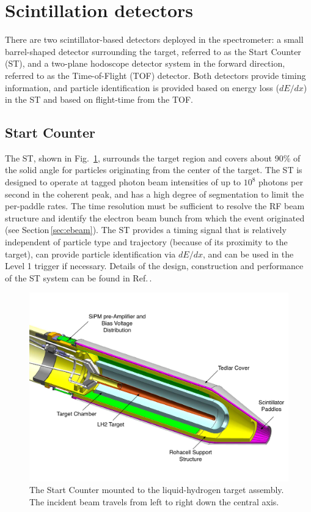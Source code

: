 \section[Scintillation detectors]{Scintillation detectors \label{sec:scintillators}}
There are two scintillator-based detectors deployed in the \gx{} spectrometer: a small barrel-shaped detector surrounding the
target, referred to as the Start Counter (ST), and a two-plane hodoscope detector system in the forward direction, referred to as the
Time-of-Flight (TOF) detector. Both detectors provide timing information, and particle identification is provided based on
energy loss ($dE/dx$) in the ST and based on flight-time from the TOF.

\subsection{Start Counter \label{sec:st}}

The ST, shown in Fig.~\ref{fig:st-overview-drawing},
surrounds the target
region and covers about 90\% of the solid angle for particles
originating from the center of the target. The ST is designed to operate
at tagged photon beam intensities of up to $10^8$ photons per second
in the coherent peak, and has a high degree of segmentation to limit
the per-paddle rates. The time resolution must be sufficient to resolve the RF beam structure and identify the electron beam bunch from which the event originated
(see Section\,\ref{sec:ebeam}). The ST provides a timing signal that is relatively independent of particle type and trajectory (because of its proximity to the target), can provide particle identification via $dE/dx$, and can be used in the Level 1 trigger if necessary. Details of the design, construction and performance of the ST system can be found in 
Ref.\,\cite{Pooser:2019rhu}.

\begin{figure}[!htb]
\centering
\includegraphics[width=1.0\columnwidth]{figures/start_counter_all.pdf}
\caption{The \gx{} Start Counter mounted to the liquid-hydrogen
  target assembly.  The incident beam travels from left to right down the central
  axis.\label{fig:st-overview-drawing}}
\end{figure}

